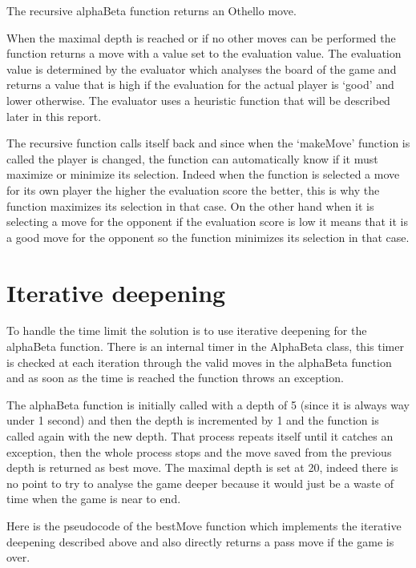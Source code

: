 The recursive alphaBeta function returns an Othello move.

When the maximal depth is reached or if no other moves can be performed the function returns a move with a value set to the evaluation value.
The evaluation value is determined by the evaluator which analyses the board of the game and returns a value that is high if the evaluation for the actual player is `good' and lower otherwise.
The evaluator uses a heuristic function that will be described later in this report.

The recursive function calls itself back and since when the `makeMove' function is called the player is changed, the function can automatically know if it must maximize or minimize its selection.
Indeed when the function is selected a move for its own player the higher the evaluation score the better, this is why the function maximizes its selection in that case.
On the other hand when it is selecting a move for the opponent if the evaluation score is low it means that it is a good move for the opponent so the function minimizes its selection in that case.

\section{Iterative deepening}

To handle the time limit the solution is to use iterative deepening for the alphaBeta function.
There is an internal timer in the AlphaBeta class, this timer is checked at each iteration through the valid moves in the alphaBeta function and as soon as the time is reached the function throws an exception.

The alphaBeta function is initially called with a depth of 5 (since it is always way under 1 second) and then the depth is incremented by 1 and the function is called again with the new depth.
That process repeats itself until it catches an exception, then the whole process stops and the move saved from the previous depth is returned as best move.
The maximal depth is set at 20, indeed there is no point to try to analyse the game deeper because it would just be a waste of time when the game is near to end.

Here is the pseudocode of the bestMove function which implements the iterative deepening described above and also directly returns a pass move if the game is over.

